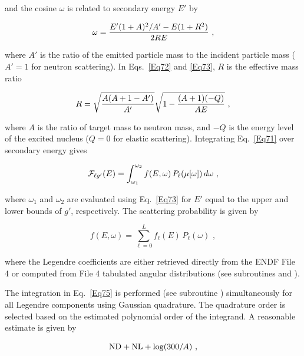 \noindent
and the cosine $\omega$ is related to secondary energy $E'$ by

  \begin{equation}
    \omega={{E'(1+A)^2/A'-E(1+R^2)}
    \over{2RE}}\,\,,
  \label{Eq73}
  \end{equation}

\noindent
where $A'$ is the ratio of the emitted particle mass to the incident
particle mass ($A'{=}1$ for neutron scattering).  In Eqs.~\ref{Eq72}
and \ref{Eq73}, $R$ is the effective mass ratio

  \begin{equation}
    R=\sqrt{\frac{A(A+1-A')}{A'}}\sqrt{1-{{(A+1)(-Q)}\over{AE}} }\,\,,
  \label{Eq74}
  \end{equation}

\noindent
where $A$ is the ratio of target mass to neutron mass, and $-Q$ is the
energy level of the excited nucleus ($Q{=}0$ for elastic scattering).
Integrating Eq.~\ref{Eq71} over secondary energy gives

  \begin{equation}
    {\cal F}_{\ell g'}(E)=\int_{\omega_1}^{\omega_2}
    f(E,\omega)\,P_{\ell}(\mu[\omega])\,d\omega\,\,,
  \label{Eq75}
  \end{equation}

\noindent
where $\omega_1$ and $\omega_2$ are evaluated using Eq.~\ref{Eq73}
for $E'$ equal to the upper and lower bounds of $g'$, respectively.
The scattering probability is given by

  \begin{equation}
    f(E,\omega)=\sum_{\ell=0}^L f_{\ell}(E)\,P_{\ell}(\omega)\,\,,
  \label{Eq76}
  \end{equation}

\noindent
where the Legendre coefficients are either retrieved directly from the
ENDF File 4 or computed from File 4 tabulated angular distributions
(see subroutines  and
).

The integration in Eq.~\ref{Eq75} is performed (see subroutine
) simultaneously for all
Legendre components using Gaussian quadrature\cite{ref13}.
  The quadrature order is selected
based on the estimated polynomial order of the integrand.  A
reasonable estimate is given by

  \begin{equation}
    {\rm ND} + {\rm NL} +\log(300/A)\,\,,
  \label{Eq77}
  \end{equation}

